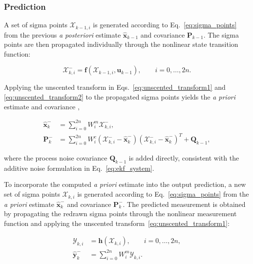 \subsubsection{Prediction}

A set of sigma points $\bm{\mathcal{X}}_{k-1,i}$ is generated according to Eq.~\eqref{eq:sigma_points} from the previous \emph{a posteriori} estimate $\hat{\bm{x}}_{k-1}$ and covariance $\bm{P}_{k-1}$. The sigma points are then propagated individually through the nonlinear state transition function:

\begin{equation}
	\bm{\mathcal{X}}_{k,i}^- = \bm{f}(\bm{\mathcal{X}}_{k-1,i}, \bm{u}_{k-1}), 
	\qquad
	i = 0, \dots, 2n.
	\label{eq:ukf_sigma_prop}
\end{equation}

Applying the unscented transform in Eqs.~\eqref{eq:unscented_transform1} and \eqref{eq:unscented_transform2} to the propagated sigma points yields the \emph{a priori} estimate and covariance \cite{Wan2001UKF},

\begin{align}
	\hat{\bm{x}}_k^- 
	&= 
	\sum_{i=0}^{2n} W_i^m \bm{\mathcal{X}}_{k,i}^-, 
	\\[4pt]
	\bm{P}_k^- 
	&= 
	\sum_{i=0}^{2n} W_i^c \left( \bm{\mathcal{X}}_{k,i}^- - \hat{\bm{x}}_k^- \right)\left( \bm{\mathcal{X}}_{k,i}^- - \hat{\bm{x}}_k^- \right)^T + \bm{Q}_{k-1},
	\label{eq:ukf_mean_cov_prop}
\end{align}

where the process noise covariance $\bm{Q}_{k-1}$ is added directly, consistent with the additive noise formulation in Eq.~\eqref{eq:ekf_system}. 

To incorporate the computed \emph{a priori} estimate into the output prediction, a new set of sigma points $\bm{\mathcal{X}}_{k,i}$ is generated according to Eq.~\eqref{eq:sigma_points} from the \emph{a priori} estimate $\hat{\bm{x}}_k^-$ and covariance $\bm{P}_k^- $. 
The predicted measurement is obtained by propagating the redrawn sigma points through the nonlinear measurement function and applying the unscented transform~\eqref{eq:unscented_transform1}:

\begin{align}
	\bm{\mathcal{Y}}_{k,i} 
	&= 
	\bm{h}(\bm{\mathcal{X}}_{k,i}), 
	\qquad
	i = 0, \dots, 2n,
	\\[4pt]
	\hat{\bm{y}}_k^- 
	&= 
	\sum_{i=0}^{2n} W_i^m \bm{\mathcal{Y}}_{k,i}.
	\label{eq:ukf_predicted_output}
\end{align}

